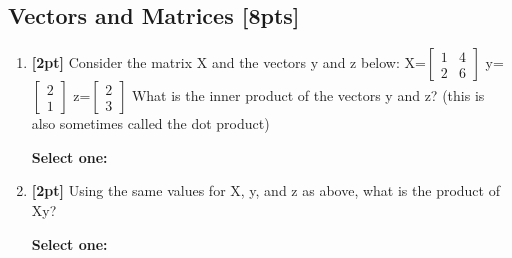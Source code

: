 \documentclass[12pt]{article}
\renewcommand{\circle}{\tikz\draw[black] (0,0) circle (1ex);}
\begin{document}
\subsection{Vectors and Matrices [8pts]}
\begin{enumerate}
    \item \textbf{[2pt]} Consider the matrix X and the vectors y and z below: X=$\begin{bmatrix} 1 & 4 \\ 2 & 6 \end{bmatrix}$ y=$\begin{bmatrix} 2 \\ 1 \end{bmatrix}$ z=$\begin{bmatrix} 2 \\ 3 \end{bmatrix}$ What is the inner product of the vectors y and z? (this is also sometimes called the dot product)

    \textbf{Select one:}


    \item \textbf{[2pt]} Using the same values for X, y, and z as above, what is the product of Xy?

    \textbf{Select one:}



\end{enumerate}
\end{document}
